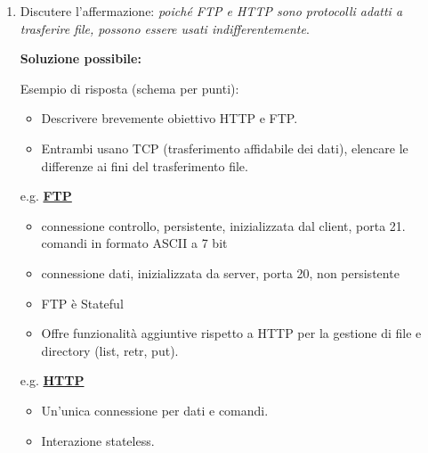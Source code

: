 \documentclass[11pt,a4paper]{article}
\theoremstyle{definition}
\begin{document}
\begin{enumerate}
	\item Discutere l'affermazione: \textit{poiché FTP e HTTP sono protocolli adatti a trasferire file, possono essere usati indifferentemente}.
	      \begin{flushleft}
		      \textbf{Soluzione possibile:}
	      \end{flushleft}
	      Esempio di risposta (schema per punti):
	      \begin{itemize}
		      \item Descrivere brevemente obiettivo HTTP e FTP.
		      \item Entrambi usano TCP (trasferimento affidabile dei dati),  elencare le differenze ai fini del trasferimento file.
	      \end{itemize}
	      e.g.  \hyperref[sec:FTP]{\textbf{FTP}}
	      \begin{itemize}
		      \item connessione controllo, persistente, inizializzata dal client, porta 21. comandi in formato ASCII a 7 bit
		      \item connessione dati, inizializzata da server, porta 20, non persistente
		      \item  FTP è Stateful
		      \item Offre funzionalità aggiuntive rispetto a HTTP per la gestione di file e directory (list, retr, put).
	      \end{itemize}
	      e.g. \hyperref[sec:HTTP Protocol]{\textbf{HTTP}}
	      \begin{itemize}
		      \item Un'unica connessione per dati e comandi.
		      \item Interazione stateless.
	      \end{itemize}
\end{enumerate}
\end{document}
